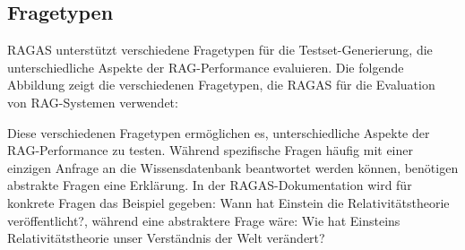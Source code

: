 \subsection{Fragetypen}

RAGAS unterstützt verschiedene Fragetypen für die Testset-Generierung, die unterschiedliche Aspekte der RAG-Performance evaluieren.
Die folgende Abbildung zeigt die verschiedenen Fragetypen, die RAGAS für die Evaluation von RAG-Systemen verwendet:

\begin{center}
\end{center}


Diese verschiedenen Fragetypen ermöglichen es, unterschiedliche Aspekte der RAG-Per\-formance zu testen.
Während spezifische Fragen häufig mit einer einzigen Anfrage an die Wissensdatenbank beantwortet werden können, benötigen abstrakte Fragen eine Erklärung.
In der RAGAS-Dokumentation \cite{ragas_query_types} wird für konkrete Fragen das Beispiel gegeben: \glqq Wann hat Einstein die Relativitätstheorie veröffentlicht?\grqq{}, während eine abstraktere Frage wäre: \glqq Wie hat Einsteins Relativitätstheorie unser Verständnis der Welt verändert?\grqq{}

